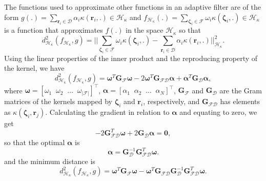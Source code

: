 The functions used to approximate other functions in an adaptive filter are of the form $g(.) =\sum_{\mathbf{r}_i \in \mathcal{D}} \alpha_i\kappa(\mathbf{r}_i,.) \in \mathcal{H}_{\kappa}$ and $f_{\mathcal{H}_\kappa}(.) =\sum_{\boldsymbol{\zeta}_i \in \mathcal{F}} \omega_i\kappa(\boldsymbol{\zeta}_i,.) \in \mathcal{H}_{\kappa}$ is a function that approximates $f(.)$ in the space $\mathcal{H}_{\kappa}$ so that 
\begin{equation}
    d_{\mathcal{H}_{\kappa}}^2(f_{\mathcal{H}_\kappa},g) = ||\sum_{\boldsymbol{\zeta}_i \in \mathcal{F}} \omega_i\kappa(\boldsymbol{\zeta}_i,.) - \sum_{\mathbf{r}_i \in \mathcal{D}} \alpha_i\kappa(\mathbf{r}_i,.)||_{\mathcal{H}_{\kappa}}^2.
\end{equation}
Using the linear properties of the inner product and the reproducing property of the kernel, we have
\begin{equation}
    d_{\mathcal{H}_{\kappa}}^2(f_{\mathcal{H}_\kappa},g)  = \boldsymbol{\omega}^{T}\mathbf{G}_{\mathcal{F}}\boldsymbol{\omega} - 2\boldsymbol{\omega}^{T}\mathbf{G}_{\mathcal{FD}}\boldsymbol{\alpha} + \boldsymbol{\alpha}^{T}\mathbf{G}_{\mathcal{D}}\boldsymbol{\alpha}, \label{eq:d2_Hk_vectorial}
\end{equation}
where $\boldsymbol{\omega} = [\omega_1\;\;\omega_2\;\;\dots\;\;\omega_{|\mathcal{F}|}]^\top$, $\boldsymbol{\alpha} = [\alpha_1\;\;\alpha_2\;\;\dots\;\;\alpha_N]^\top$, $\mathbf{G}_{\mathcal{F}}$ and $\mathbf{G}_{\mathcal{D}}$ are the Gram matrices of the kernels mapped by $\boldsymbol{\zeta}_i$ and $\mathbf{r}_i$, respectively, and $\mathbf{G}_{\mathcal{FD}}$ has elements as $\kappa(\boldsymbol{\zeta}_i,\mathbf{r}_j)$.
Calculating the gradient in relation to $\boldsymbol{\alpha}$ and equating to zero, we get
\begin{equation}
    -2\mathbf{G}_{\mathcal{FD}}^{T}\boldsymbol{\omega} + 2\mathbf{G}_{\mathcal{D}}\boldsymbol{\alpha} = \mathbf{0},
\end{equation}
so that the optimal $\boldsymbol{\alpha}$ is
\begin{equation}
    \boldsymbol{\alpha} = \mathbf{G}_{\mathcal{D}}^{-1}\mathbf{G}_{\mathcal{FD}}^{T}\boldsymbol{\omega}.\label{eq:alpha_Hk}
\end{equation}
and the minimum distance is
\begin{equation}
    d_{\mathcal{H}_{\kappa}}^2(f_{\mathcal{H}_\kappa},g)  = \boldsymbol{\omega}^{T}\mathbf{G}_{\mathcal{F}}\boldsymbol{\omega} - \boldsymbol{\omega}^{T}\mathbf{G}_{\mathcal{FD}}\mathbf{G}_{\mathcal{D}}^{-1}\mathbf{G}_{\mathcal{FD}}^{T}\boldsymbol{\omega}.\label{eq:d2_Hk}
\end{equation}

